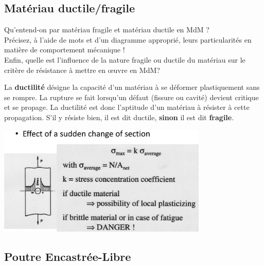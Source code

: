\documentclass[a4paper]{article}
\begin{document}
\subsection{Matériau ductile/fragile}





\begin{siderules}
Qu’entend-on par matériau fragile et matériau ductile en MdM ? \\
Précisez, à l’aide de mots et d’un diagramme approprié, leurs particularités en matière de comportement mécanique ! \\
Enfin, quelle est l’influence de la nature fragile ou ductile du matériau sur le critère de résistance à mettre en œuvre en MdM?
\end{siderules}

La \textbf{ductilité} désigne la capacité d'un matériau à se déformer plastiquement sans se rompre. La rupture se fait lorsqu'un défaut (fissure ou cavité) devient critique et se propage. La ductilité est donc l'aptitude d'un matériau à résister à cette propagation. S'il y résiste bien, il est dit ductile, \textbf{sinon} il est dit \textbf{fragile}.

\begin{center}
\includegraphics[width=0.75\textwidth]{images/ductilefragile.PNG}
\end{center}





\subsection{Poutre Encastrée-Libre}
\end{document}
